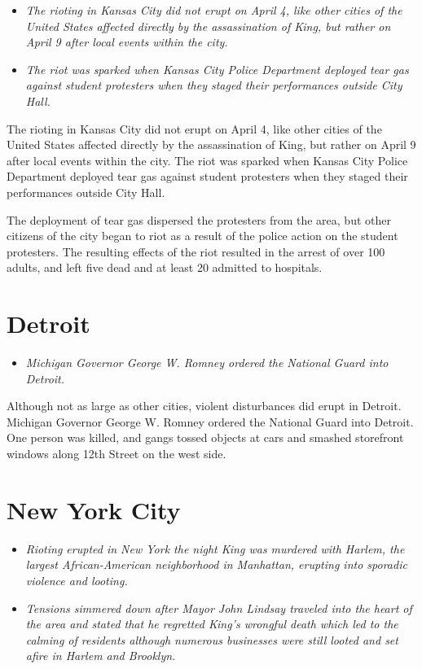\begin{itemize}
\item
  \emph{The rioting in Kansas City did not erupt on April 4, like other
  cities of the United States affected directly by the assassination of
  King, but rather on April 9 after local events within the city.}
\item
  \emph{The riot was sparked when Kansas City Police Department deployed
  tear gas against student protesters when they staged their
  performances outside City Hall.}
\end{itemize}

The rioting in Kansas City did not erupt on April 4, like other cities
of the United States affected directly by the assassination of King, but
rather on April 9 after local events within the city. The riot was
sparked when Kansas City Police Department deployed tear gas against
student protesters when they staged their performances outside City
Hall.

The deployment of tear gas dispersed the protesters from the area, but
other citizens of the city began to riot as a result of the police
action on the student protesters. The resulting effects of the riot
resulted in the arrest of over 100 adults, and left five dead and at
least 20 admitted to hospitals.

\section{Detroit}\label{detroit}

\begin{itemize}
\item
  \emph{Michigan Governor George W. Romney ordered the National Guard
  into Detroit.}
\end{itemize}

Although not as large as other cities, violent disturbances did erupt in
Detroit. Michigan Governor George W. Romney ordered the National Guard
into Detroit. One person was killed, and gangs tossed objects at cars
and smashed storefront windows along 12th Street on the west side.

\section{New York City}\label{new-york-city}

\begin{itemize}
\item
  \emph{Rioting erupted in New York the night King was murdered with
  Harlem, the largest African-American neighborhood in Manhattan,
  erupting into sporadic violence and looting.}
\item
  \emph{Tensions simmered down after Mayor John Lindsay traveled into
  the heart of the area and stated that he regretted King's wrongful
  death which led to the calming of residents although numerous
  businesses were still looted and set afire in Harlem and Brooklyn.}
\end{itemize}


